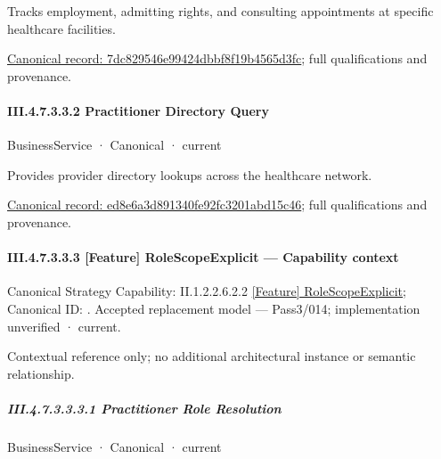 Tracks employment, admitting rights, and consulting appointments at specific healthcare facilities.


{\footnotesize \href{../../../../../../../../continuum/business/business-function/7dc829546e99424dbbf8f19b4565d3fc.md}{Canonical record: 7dc829546e99424dbbf8f19b4565d3fc}; full qualifications and provenance.}\par
\paragraph*{III.4.7.3.3.2 Practitioner Directory Query}
\label{navigation:III.4.7.3.3.2}

\label{element:ed8e6a3d891340fe92fc3201abd15c46}
{\small BusinessService · Canonical · current}\par

Provides provider directory lookups across the healthcare network.


{\footnotesize \href{../../../../../../../../continuum/business/business-service/ed8e6a3d891340fe92fc3201abd15c46.md}{Canonical record: ed8e6a3d891340fe92fc3201abd15c46}; full qualifications and provenance.}\par
\paragraph*{III.4.7.3.3.3 [Feature] RoleScopeExplicit — Capability context}
\label{navigation:III.4.7.3.3.3}

{\small Canonical Strategy Capability: II.1.2.2.6.2.2 \hyperref[element:1541d71b5c924ed49e618f2496011c81]{[Feature] RoleScopeExplicit}; Canonical ID: \texttt{}. Accepted replacement model — Pass3/014; implementation unverified · current.}\par
Contextual reference only; no additional architectural instance or semantic relationship.\par
\subparagraph*{III.4.7.3.3.3.1 Practitioner Role Resolution}
\label{navigation:III.4.7.3.3.3.1}

\label{element:c3e5c04e2a194b4a8d49b8776fce2c51}
{\small BusinessService · Canonical · current}\par

